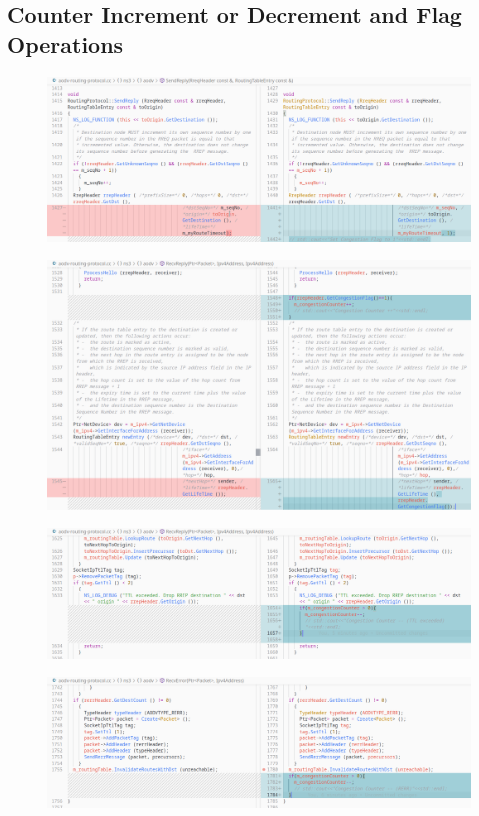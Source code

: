 \documentclass[12pt, a4paper]{article}
\begin{document}
\subsection{Counter Increment or Decrement and Flag Operations}
\begin{figure}[H]
\centering
\includegraphics[scale = 0.4]{images/cc-aodv/aodv-09.png}
\end{figure}
\begin{figure}[H]
\centering
\includegraphics[scale = 0.4]{images/cc-aodv/aodv-10.png}

\end{figure}
\begin{figure}[H]
\centering
\includegraphics[scale = 0.4]{images/cc-aodv/aodv-11.png}

\end{figure}
\begin{figure}[H]
\centering
\includegraphics[scale = 0.4]{images/cc-aodv/aodv-12.png}
\end{figure}
\end{document}
